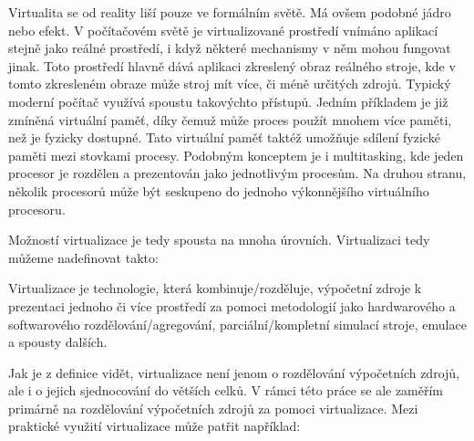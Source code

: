 Virtualita se od reality liší pouze ve formálním světě. Má ovšem podobné jádro nebo efekt. V počítačovém světě je virtualizované prostředí vnímáno aplikací stejně jako reálné prostředí, i když některé mechanismy v něm mohou fungovat jinak. Toto prostředí hlavně dává aplikaci zkreslený obraz reálného stroje, kde v tomto zkresleném obraze může stroj mít více, či méně určitých zdrojů. Typický moderní počítač využívá spoustu takovýchto přístupů. Jedním příkladem je již zmíněná virtuální paměť, díky čemuž může proces použít mnohem více paměti, než je fyzicky dostupné. Tato virtuální paměť taktéž umožňuje sdílení fyzické paměti mezi stovkami procesy. Podobným konceptem je i multitasking, kde jeden procesor je rozdělen a prezentován jako  jednotlivým procesům. Na druhou stranu, několik procesorů může být seskupeno do jednoho výkonnějšího virtuálního procesoru.

Možností virtualizace je tedy spousta na mnoha úrovních. Virtualizaci tedy můžeme nadefinovat takto:

\begin{displayquote}
    Virtualizace je technologie, která kombinuje/rozděluje, výpočetní zdroje k prezentaci jednoho či více prostředí za pomoci metodologií jako hardwarového a softwarového rozdělování/agregování, parciální/kompletní simulací stroje, emulace a spousty dalších.
\end{displayquote}

Jak je z definice vidět, virtualizace není jenom o rozdělování výpočetních zdrojů, ale i o jejich sjednocování do větších celků. V rámci této práce se ale zaměřím primárně na rozdělování výpočetních zdrojů za pomoci virtualizace. Mezi praktické využití virtualizace může patřit například:

